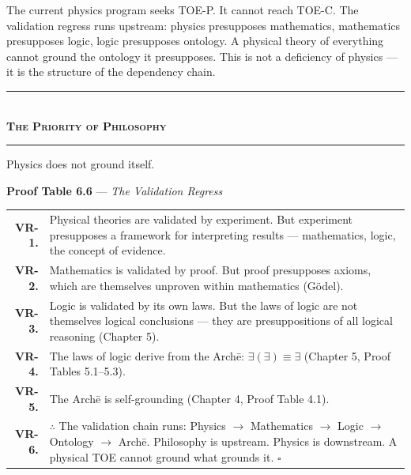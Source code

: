 \documentclass[10pt, openany, oneside]{book}
\renewcommand{\normalsize}{\fontsize{10}{13}\selectfont}
\renewcommand{\footnotesize}{\fontsize{8.5}{11}\selectfont}
\begin{document}
The current physics program seeks TOE-P. It cannot reach TOE-C. The validation regress runs upstream: physics presupposes mathematics, mathematics presupposes logic, logic presupposes ontology. A physical theory of everything cannot ground the ontology it presupposes. This is not a deficiency of physics --- it is the structure of the dependency chain.

\vspace{1.5em}


\begin{center}
    \rule{0.3\textwidth}{0.4pt}\\[0.5em]
    {\normalsize\bfseries\scshape The Priority of Philosophy}\\[0.3em]
    \rule{0.3\textwidth}{0.4pt}
\end{center}

\vspace{1em}

\noindent Physics does not ground itself.

\vspace{0.5em}

\textbf{Proof Table 6.6} --- \textit{The Validation Regress}

\vspace{0.5em}

{\footnotesize
\noindent\begin{tabular}{r p{}}
\textbf{VR-1.} & Physical theories are validated by experiment. But experiment presupposes a framework for interpreting results --- mathematics, logic, the concept of evidence. \\[0.3em]
\textbf{VR-2.} & Mathematics is validated by proof. But proof presupposes axioms, which are themselves unproven within mathematics (G\"{o}del). \\[0.3em]
\textbf{VR-3.} & Logic is validated by its own laws. But the laws of logic are not themselves logical conclusions --- they are presuppositions of all logical reasoning (Chapter 5). \\[0.3em]
\textbf{VR-4.} & The laws of logic derive from the Arch\={e}: $\exists(\exists) \equiv \exists$ (Chapter 5, Proof Tables 5.1--5.3). \\[0.3em]
\textbf{VR-5.} & The Arch\={e} is self-grounding (Chapter 4, Proof Table 4.1). \\[0.3em]
\textbf{VR-6.} & $\therefore$ The validation chain runs: Physics $\to$ Mathematics $\to$ Logic $\to$ Ontology $\to$ Arch\={e}. Philosophy is upstream. Physics is downstream. A physical TOE cannot ground what grounds it. $\square$ \\[0.3em]
\end{tabular}
}
\end{document}
